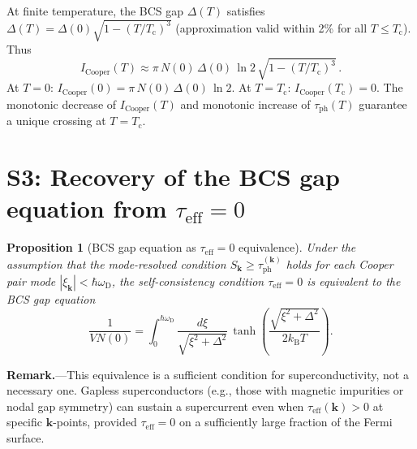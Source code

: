 \documentclass[prb,twocolumn,superscriptaddress,longbibliography,floatfix]{revtex4-2}
\newtheorem*{proposition}{Proposition}
\newcommand{\kB}{k_{\mathrm{B}}}
\newcommand{\tauasym}{\tau}
\newcommand{\taueff}{\tauasym_{\mathrm{eff}}}
\newcommand{\taudec}{\tauasym_{\mathrm{ph}}}
\newcommand{\Icoop}{I_{\mathrm{Cooper}}}
\newcommand{\Tc}{T_{\mathrm{c}}}
\newcommand{\oD}{\omega_{\mathrm{D}}}
\newcommand{\xik}{\xi_{\bm{k}}}
\begin{document}
At finite temperature, the BCS gap $\Delta(T)$ satisfies
$\Delta(T) = \Delta(0)\sqrt{1 - (T/\Tc)^3}$ (approximation
valid within 2\% for all $T \leq \Tc$).  Thus
\begin{equation}\label{eq:S2_IT}
  \Icoop(T) \approx \pi\, N(0)\, \Delta(0)\, \ln 2\,
  \sqrt{1 - (T/\Tc)^3}\,.
\end{equation}
At $T = 0$: $\Icoop(0) = \pi\, N(0)\, \Delta(0)\, \ln 2$.
At $T = \Tc$: $\Icoop(\Tc) = 0$.
The monotonic decrease of $\Icoop(T)$ and monotonic increase
of $\taudec(T)$ guarantee a unique crossing at $T = \Tc$.

\section{S3: Recovery of the BCS gap equation from $\taueff = 0$}
\label{sec:S3}

\begin{proposition}[BCS gap equation as $\taueff = 0$ equivalence]
\label{thm:S3_gap}
Under the assumption that the mode-resolved condition
$S_{\bm{k}} \geq \taudec^{(\bm{k})}$ holds for each Cooper pair
mode $|\xik| < \hbar\oD$, the self-consistency condition
$\taueff = 0$ is equivalent to the BCS gap equation
\begin{equation}\label{eq:S3_BCS}
  \frac{1}{VN(0)} = \int_0^{\hbar\oD}
  \frac{d\xi}{\sqrt{\xi^2 + \Delta^2}}\,
  \tanh\!\left(\frac{\sqrt{\xi^2 + \Delta^2}}{2\kB T}\right).
\end{equation}
\end{proposition}

\textbf{Remark.}---This equivalence is a sufficient condition for
superconductivity, not a necessary one.  Gapless superconductors
(e.g., those with magnetic impurities or nodal gap symmetry) can
sustain a supercurrent even when $\taueff(\bm{k}) > 0$ at
specific $\bm{k}$-points, provided $\taueff = 0$ on a
sufficiently large fraction of the Fermi surface.
\end{document}
